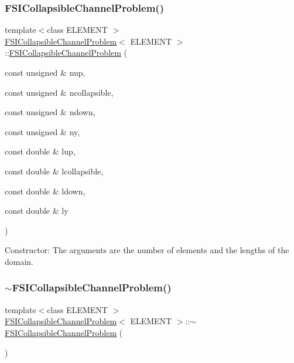 \subsubsection{\texorpdfstring{F\+S\+I\+Collapsible\+Channel\+Problem()}{FSICollapsibleChannelProblem()}\hspace{0.1cm}{\footnotesize\ttfamily [3/4]}}
{\footnotesize\ttfamily template$<$class E\+L\+E\+M\+E\+NT $>$ \\
\hyperlink{classFSICollapsibleChannelProblem}{F\+S\+I\+Collapsible\+Channel\+Problem}$<$ E\+L\+E\+M\+E\+NT $>$\+::\hyperlink{classFSICollapsibleChannelProblem}{F\+S\+I\+Collapsible\+Channel\+Problem} (\begin{DoxyParamCaption}\item[{const unsigned \&}]{nup,  }\item[{const unsigned \&}]{ncollapsible,  }\item[{const unsigned \&}]{ndown,  }\item[{const unsigned \&}]{ny,  }\item[{const double \&}]{lup,  }\item[{const double \&}]{lcollapsible,  }\item[{const double \&}]{ldown,  }\item[{const double \&}]{ly }\end{DoxyParamCaption})}



Constructor\+: The arguments are the number of elements and the lengths of the domain. 

\mbox{\label{classFSICollapsibleChannelProblem_abe33aaaae15ea3eb10885527a1d1ad9a}} 
\subsubsection{\texorpdfstring{$\sim$\+F\+S\+I\+Collapsible\+Channel\+Problem()}{~FSICollapsibleChannelProblem()}\hspace{0.1cm}{\footnotesize\ttfamily [3/4]}}
{\footnotesize\ttfamily template$<$class E\+L\+E\+M\+E\+NT $>$ \\
\hyperlink{classFSICollapsibleChannelProblem}{F\+S\+I\+Collapsible\+Channel\+Problem}$<$ E\+L\+E\+M\+E\+NT $>$\+::$\sim$\hyperlink{classFSICollapsibleChannelProblem}{F\+S\+I\+Collapsible\+Channel\+Problem} (\begin{DoxyParamCaption}{ }\end{DoxyParamCaption})\hspace{0.3cm}{\ttfamily [inline]}}



